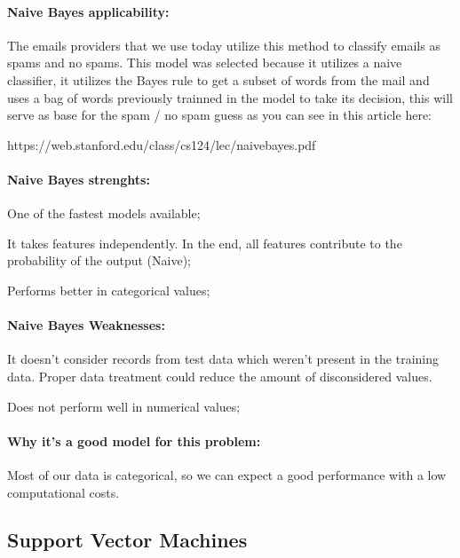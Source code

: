 \documentclass[11pt]{article}
\begin{document}
\paragraph{Naive Bayes applicability:}\label{naive-bayes-applicability}

The emails providers that we use today utilize this method to classify
emails as spams and no spams. This model was selected because it
utilizes a naive classifier, it utilizes the Bayes rule to get a subset
of words from the mail and uses a bag of words previously trainned in
the model to take its decision, this will serve as base for the spam /
no spam guess as you can see in this article here:

https://web.stanford.edu/class/cs124/lec/naivebayes.pdf

\paragraph{Naive Bayes strenghts:}\label{naive-bayes-strenghts}

One of the fastest models available;

It takes features independently. In the end, all features contribute to
the probability of the output (Naive);

Performs better in categorical values;

\paragraph{Naive Bayes Weaknesses:}\label{naive-bayes-weaknesses}

It doesn't consider records from test data which weren't present in the
training data. Proper data treatment could reduce the amount of
disconsidered values.

Does not perform well in numerical values;

\paragraph{Why it's a good model for this
problem:}\label{why-its-a-good-model-for-this-problem}

Most of our data is categorical, so we can expect a good performance
with a low computational costs.

\subsection{Support Vector Machines}\label{support-vector-machines}
\end{document}
